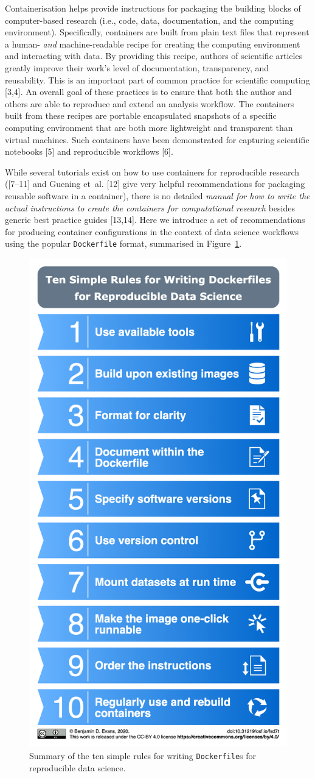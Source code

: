 \documentclass[10pt,letterpaper]{article}
\begin{document}
Containerisation helps provide instructions for packaging the building
blocks of computer-based research (i.e., code, data, documentation, and
the computing environment). Specifically, containers are built from
plain text files that represent a human- \emph{and} machine-readable
recipe for creating the computing environment and interacting with data.
By providing this recipe, authors of scientific articles greatly improve
their work's level of documentation, transparency, and reusability. This
is an important part of common practice for scientific computing
{[}3,4{]}. An overall goal of these practices is to ensure that both the
author and others are able to reproduce and extend an analysis workflow.
The containers built from these recipes are portable encapsulated
snapshots of a specific computing environment that are both more
lightweight and transparent than virtual machines. Such containers have
been demonstrated for capturing scientific notebooks {[}5{]} and
reproducible workflows {[}6{]}.

While several tutorials exist on how to use containers for reproducible
research ({[}7--11{]} and Guening et~al. {[}12{]} give very helpful
recommendations for packaging reusable software in a container), there
is no detailed \emph{manual for how to write the actual instructions to
create the containers for computational research} besides generic best
practice guides {[}13,14{]}. Here we introduce a set of recommendations
for producing container configurations in the context of data science
workflows using the popular \texttt{Dockerfile} format, summarised in
Figure~\ref{fig:summary}.

\begin{figure}[h]

{\centering \includegraphics[width=0.5\linewidth]{summary} 

}

\caption{Summary of the ten simple rules for writing \texttt{Dockerfile}s for reproducible data science.}\label{fig:summary}
\end{figure}
\end{document}
